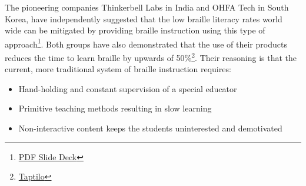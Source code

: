 \documentclass[14pt,letterpaper,twoside]{extreport}
\begin{document}
The pioneering companies Thinkerbell Labs in India and OHFA Tech in South Korea, have independently suggested that the low braille literacy rates world wide can be mitigated by providing braille instruction using this type of approach\footnote{\href{https://www.thinkerbelllabs.com/static/decks/tl_deck.pdf}{PDF Slide Deck}}. Both groups have also demonstrated that the use of their products reduces the time to learn braille by upwards of 50\%\footnote{\href{https://www.taptilo.com/}{Taptilo}}. Their reasoning is that the current, more traditional system of braille instruction requires:
\begin{itemize}
\item Hand-holding and constant supervision of a special educator
\item Primitive teaching methods resulting in slow learning
\item Non-interactive content keeps the students uninterested and demotivated
\end{itemize}
\end{document}
